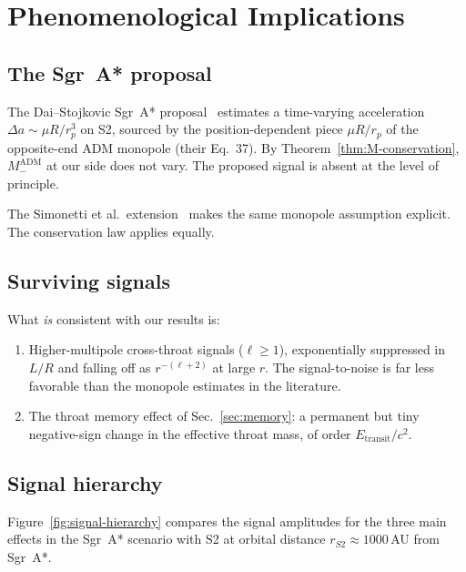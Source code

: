 \documentclass[aps,prd,onecolumn,nofootinbib,superscriptaddress]{revtex4-2}
\begin{document}
\section{Phenomenological Implications}
\label{sec:phenomenology}

\subsection{The Sgr~A* proposal}

The Dai--Stojkovic Sgr~A* proposal~\cite{DaiStojkovic2019Observing} estimates
a time-varying acceleration $\Delta a\sim\mu R/r_p^3$ on S2, sourced by the
position-dependent piece $\mu R/r_p$ of the opposite-end ADM monopole (their
Eq.~37).  By Theorem~\ref{thm:M-conservation}, $M_-^{\mathrm{ADM}}$ at our
side does not vary.  The proposed signal is absent at the level of principle.

The Simonetti et al.\ extension~\cite{SimonettiEtAl2021SensitiveSearches}
makes the same monopole assumption explicit.  The conservation law applies
equally.

\subsection{Surviving signals}

What \emph{is} consistent with our results is:
\begin{enumerate}
  \item Higher-multipole cross-throat signals ($\ell\ge 1$), exponentially
    suppressed in $L/R$ and falling off as $r^{-(\ell+2)}$ at large $r$.  The
    signal-to-noise is far less favorable than the monopole estimates in the
    literature.
  \item The throat memory effect of Sec.~\ref{sec:memory}: a permanent but
    tiny negative-sign change in the effective throat mass, of order
    $E_{\mathrm{transit}}/c^2$.
\end{enumerate}

\subsection{Signal hierarchy}

Figure~\ref{fig:signal-hierarchy} compares the signal amplitudes for the three
main effects in the Sgr~A* scenario with S2 at orbital distance $r_{S2}\approx
1000$\,AU from Sgr~A*.
\end{document}
